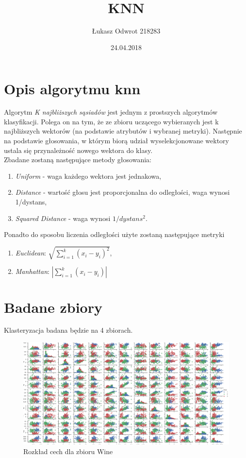 \documentclass[12pt,a4paper]{article}
\title{KNN}
\date{24.04.2018}
\author{Łukasz Odwrot 218283}
\begin{document}
\maketitle
\thispagestyle{empty}
\newpage
\tableofcontents
\setcounter{page}{1}
\newpage

\section{Opis algorytmu knn}
Algorytm \textit{K najbliższych sąsiadów} jest jednym z prostszych algorytmów klasyfikacji. Polega on na tym, że ze zbioru uczącego wybieranych jest k najbliższych wektorów (na podstawie atrybutów i wybranej metryki). Następnie na podstawie głosowania, w którym biorą udział wyselekcjonowane wektory ustala się przynależność nowego wektora do klasy.\\
Zbadane zostaną następujące metody głosowania:
\begin{enumerate}
  \item \textit{Uniform} - waga każdego wektora jest jednakowa,
  \item \textit{Distance} - wartość głosu jest proporcjonalna do odległości, waga wynosi 1/dystans,
  \item \textit{Squared Distance} - waga wynosi $1/dystans^2$.
\end{enumerate}

Ponadto do sposobu liczenia odległości użyte zostaną następujące metryki

\begin{enumerate}
  \item \textit{Euclidean}: $\sqrt{\sum_{i=1}^k(x_i - y_i)^2} $,
  \item \textit{Manhattan}: $|\sum_{i=1}^k(x_i - y_i)| $
\end{enumerate}


\section{Badane zbiory}

Klasteryzacja badana będzie na 4 zbiorach.
\begin{figure}[H]
\centering
\includegraphics[width=1\textwidth]{dsWineCombined.png}
\caption{Rozkład cech dla zbioru Wine}
\end{figure}
\end{document}
